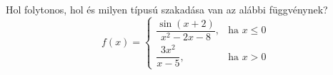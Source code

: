 \documentclass[11pt]{scrartcl}
\begin{document}
Hol folytonos, hol és milyen típusú szakadása van az alábbi függvénynek?
\[
	f(x) = \begin{cases}
		\dfrac{\sin(x + 2)}{x^2 - 2x - 8}, & \text{ha } x \le 0 \\[2ex]
		\dfrac{3x^2}{x - 5},              & \text{ha } x > 0
	\end{cases}
\]
\end{document}
